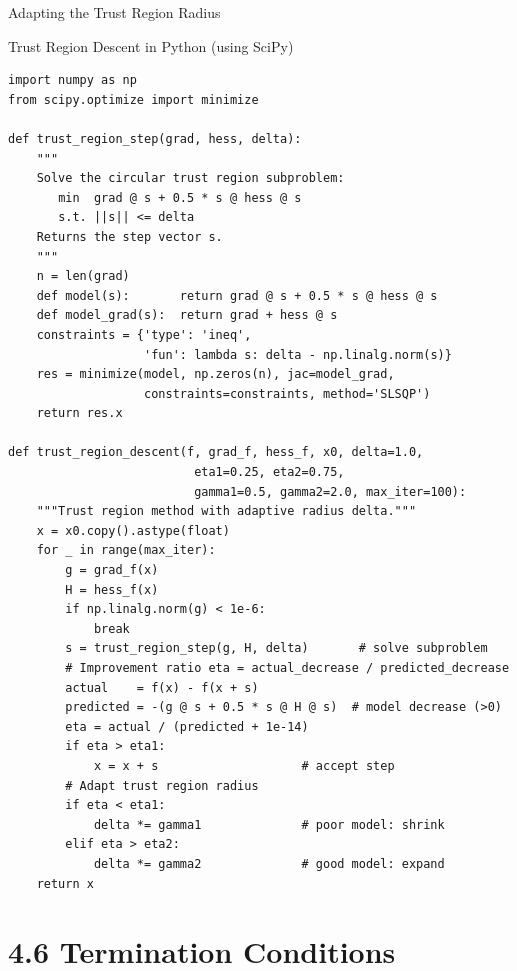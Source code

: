 \documentclass[aspectratio=169,10pt]{beamer}
\begin{document}
\begin{frame}[allowframebreaks]{Adapting the Trust Region Radius}
\end{frame}

\begin{frame}[fragile]{Trust Region Descent in Python (using SciPy)}

\begin{lstlisting}[style=pycode]
import numpy as np
from scipy.optimize import minimize

def trust_region_step(grad, hess, delta):
    """
    Solve the circular trust region subproblem:
       min  grad @ s + 0.5 * s @ hess @ s
       s.t. ||s|| <= delta
    Returns the step vector s.
    """
    n = len(grad)
    def model(s):       return grad @ s + 0.5 * s @ hess @ s
    def model_grad(s):  return grad + hess @ s
    constraints = {'type': 'ineq',
                   'fun': lambda s: delta - np.linalg.norm(s)}
    res = minimize(model, np.zeros(n), jac=model_grad,
                   constraints=constraints, method='SLSQP')
    return res.x

def trust_region_descent(f, grad_f, hess_f, x0, delta=1.0,
                          eta1=0.25, eta2=0.75,
                          gamma1=0.5, gamma2=2.0, max_iter=100):
    """Trust region method with adaptive radius delta."""
    x = x0.copy().astype(float)
    for _ in range(max_iter):
        g = grad_f(x)
        H = hess_f(x)
        if np.linalg.norm(g) < 1e-6:
            break
        s = trust_region_step(g, H, delta)       # solve subproblem
        # Improvement ratio eta = actual_decrease / predicted_decrease
        actual    = f(x) - f(x + s)
        predicted = -(g @ s + 0.5 * s @ H @ s)  # model decrease (>0)
        eta = actual / (predicted + 1e-14)
        if eta > eta1:
            x = x + s                    # accept step
        # Adapt trust region radius
        if eta < eta1:
            delta *= gamma1              # poor model: shrink
        elif eta > eta2:
            delta *= gamma2              # good model: expand
    return x
\end{lstlisting}

\end{frame}

\section{4.6 Termination Conditions}
\end{document}
